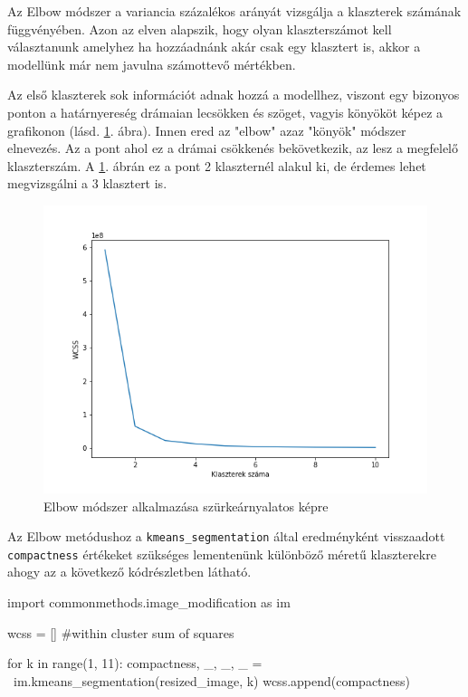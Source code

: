 
Az Elbow módszer a variancia százalékos arányát vizsgálja a klaszterek számának függvényében. Azon az elven alapszik, hogy olyan klaszterszámot kell választanunk amelyhez ha hozzáadnánk akár csak egy klasztert is, akkor a modellünk már nem javulna számottevő mértékben.

Az első klaszterek sok információt adnak hozzá a modellhez, viszont egy bizonyos ponton a határnyereség drámaian lecsökken és szöget, vagyis könyököt képez a grafikonon (lásd. \ref{fig:elbow_grayscale}. ábra). Innen ered az "elbow" azaz "könyök" módszer elnevezés. Az a pont ahol ez a drámai csökkenés bekövetkezik, az lesz a megfelelő klaszterszám. A \ref{fig:elbow_grayscale}. ábrán ez a pont 2 klaszternél alakul ki, de érdemes lehet megvizsgálni a 3 klasztert is. \cite{elbow}

\begin{figure}[h]
\centering
\includegraphics[scale=0.7]{images/elbow_grayscale.png}
\caption{Elbow módszer alkalmazása szürkeárnyalatos képre}
\label{fig:elbow_grayscale}
\end{figure}

Az Elbow metódushoz a \texttt{kmeans\_segmentation} által eredményként visszaadott \texttt{compactness} értékeket szükséges lementenünk különböző méretű klaszterekre ahogy az a következő kódrészletben látható.
\begin{python}
import commonmethods.image_modification as im

wcss = []   #within cluster sum of squares

for k in range(1, 11):
    compactness, _, _, _ = \
        im.kmeans_segmentation(resized_image, k)
    wcss.append(compactness)
\end{python}

